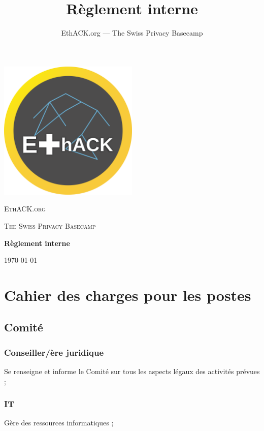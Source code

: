 \documentclass[12pt,twoside]{report}
\author{EthACK.org — The Swiss Privacy Basecamp}
\title{Règlement interne}
\begin{document}
\begin{titlepage}
\centering
\includegraphics[width=0.50\textwidth]{../logo-4096.png}\par\vspace{2cm}
{\scshape\LARGE EthACK.org \par}
\vspace{1cm}
{\scshape\Large The Swiss Privacy Basecamp \par}
\vspace{1.5cm}
{\huge\bfseries Règlement interne\par}

\vfill
{\large \today\par}
\end{titlepage}

\tableofcontents
\newpage

\setlength{\parindent}{0cm}

\section*{Cahier des charges pour les postes}
\subsection*{Comité}

\subsubsection*{Conseiller/ère juridique}
Se renseigne et informe le Comité sur tous les aspects légaux des activités prévues ;

\subsubsection*{IT}
Gère des ressources informatiques ;
\end{document}
